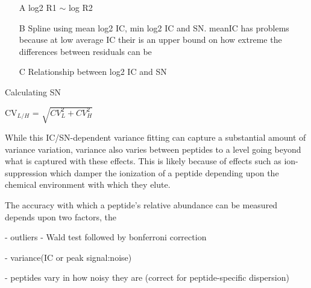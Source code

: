 \documentclass[12pt]{article}
\begin{document}
\color{red}
\begin{itemize}
\item[A] log2 R1 $\sim$ log R2
\item[B] Spline using mean log2 IC, min log2 IC and SN.
meanIC has problems because at low average IC their is an upper bound on how extreme the differences between residuals can be
\item[C] Relationship between log2 IC and SN
\end{itemize}

Calculating SN

CV$_{L/H}$ = $\sqrt{CV_{L}^{2} + CV_{H}^2}$

\color{black}


While this IC/SN-dependent variance fitting can capture a substantial amount of variance variation, variance also varies between peptides to a level going beyond what is captured with these effects.  This is likely because of effects such as ion-suppression which damper the ionization of a peptide depending upon the chemical environment with which they elute.  


The accuracy with which a peptide's relative abundance can be measured depends upon two factors, the 

- outliers - Wald test followed by bonferroni correction

- variance(IC or peak signal:noise)

- peptides vary in how noisy they are (correct for peptide-specific dispersion)
\end{document}

